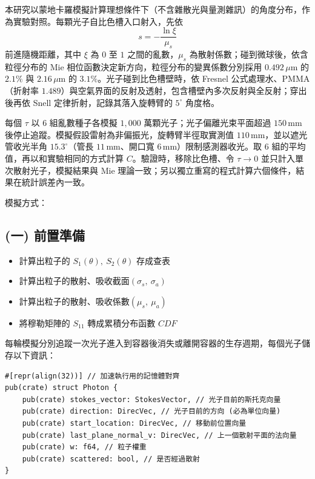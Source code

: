
本研究以蒙地卡羅模擬計算理想條件下（不含雜散光與量測雜訊）的角度分布，作為實驗對照。每顆光子自比色槽入口射入，先依
\[
s=-\frac{\ln\xi}{\mu_s}
\]
前進隨機距離，其中 $\xi$ 為 $0$ 至 $1$ 之間的亂數，$\mu_s$ 為散射係數；碰到微球後，依含粒徑分布的 Mie 相位函數決定新方向，粒徑分布的變異係數分別採用 $0.492\,\mu\mathrm{m}$ 的 $2.1\%$ 與 $2.16\,\mu\mathrm{m}$ 的 $3.1\%$。光子碰到比色槽壁時，依 Fresnel 公式處理水、PMMA（折射率 $1.489$）與空氣界面的反射及透射，包含槽壁內多次反射與全反射；穿出後再依 Snell 定律折射，記錄其落入旋轉臂的 $5^\circ$ 角度格。

每個 $\tau$ 以 $6$ 組亂數種子各模擬 $1{,}000$ 萬顆光子；光子偏離光束平面超過 $150\,\mathrm{mm}$ 後停止追蹤。模擬假設雷射為非偏振光，旋轉臂半徑取實測值 $110\,\mathrm{mm}$，並以遮光管收光半角 $15.3^\circ$（管長 $11\,\mathrm{mm}$、開口寬 $6\,\mathrm{mm}$）限制感測器收光。取 $6$ 組的平均值，再以和實驗相同的方式計算 $C$。驗證時，移除比色槽、令 $\tau\to0$ 並只計入單次散射光子，模擬結果與 Mie 理論一致；另以獨立重寫的程式計算六個條件，結果在統計誤差內一致。

模擬方式：
\subsection*{(一) 前置準備}
\begin{itemize}
    \item[1.] 計算出粒子的 $S_1(\theta),\ S_2(\theta)$ 存成查表
    \item[2.] 計算出粒子的散射、吸收截面$\left(\sigma_s,\ \sigma_a\right)$
    \item[3.] 計算出粒子的散射、吸收係數$\left(\mu_s,\ \mu_a\right)$
    \item[4.] 將穆勒矩陣的 $S_{11}$ 轉成累積分布函數 $CDF$ 
\end{itemize}

每輪模擬分別追蹤一次光子進入到容器後消失或離開容器的生存週期，每個光子儲存以下資訊：
\begin{verbatim}
#[repr(align(32))] // 加速執行用的記憶體對齊
pub(crate) struct Photon {
    pub(crate) stokes_vector: StokesVector, // 光子目前的斯托克向量
    pub(crate) direction: DirecVec, // 光子目前的方向 (必為單位向量)
    pub(crate) start_location: DirecVec, // 移動前位置向量
    pub(crate) last_plane_normal_v: DirecVec, // 上一個散射平面的法向量
    pub(crate) w: f64, // 粒子權重
    pub(crate) scattered: bool, // 是否經過散射
}
\end{verbatim}

